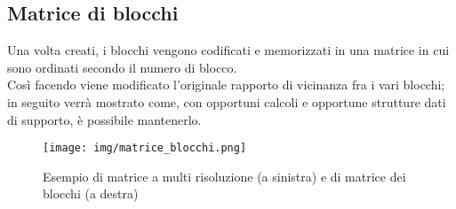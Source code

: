 	\subsection{Matrice di blocchi} 
	Una volta creati, i blocchi vengono codificati e memorizzati in una matrice in cui sono ordinati secondo il numero di blocco.\\ Cos\`{i} facendo viene modificato l'originale rapporto di vicinanza fra i vari blocchi; in seguito verr\`{a} mostrato come, con opportuni calcoli e opportune strutture dati di supporto, \`{e} possibile mantenerlo.
	\begin{figure}[htbp]
		\centering
		\texttt{[image: img/matrice\_blocchi.png]}
		\caption{Esempio di matrice a multi risoluzione (a sinistra) e di matrice dei blocchi (a destra)}
	\end{figure}
	